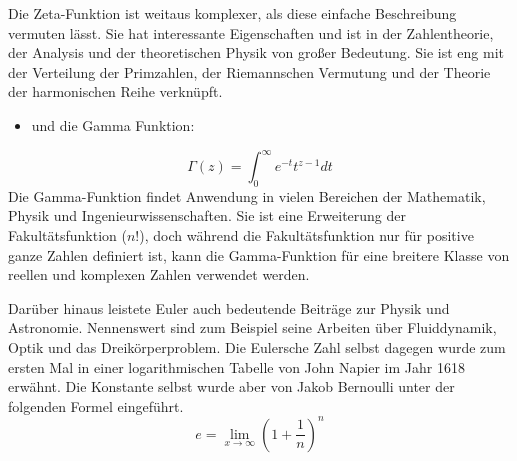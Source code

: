 Die Zeta-Funktion ist weitaus komplexer, als diese einfache Beschreibung vermuten lässt. Sie hat interessante Eigenschaften und ist in der Zahlentheorie, der Analysis und der theoretischen Physik von großer Bedeutung. Sie ist eng mit der Verteilung der Primzahlen, der Riemannschen Vermutung und der Theorie der harmonischen Reihe verknüpft.
\begin{itemize}
  \item und die Gamma Funktion:
\end{itemize} \[
\Gamma(z) = \int_0^\infty e^{-t} t^{z-1} dt \] 
Die Gamma-Funktion findet Anwendung in vielen Bereichen der Mathematik, Physik und Ingenieurwissenschaften. Sie ist eine Erweiterung der Fakultätsfunktion ($n!$), doch während die Fakultätsfunktion nur für positive ganze Zahlen definiert ist, kann die Gamma-Funktion für eine breitere Klasse von reellen und komplexen Zahlen verwendet werden.
\par Darüber hinaus leistete Euler auch bedeutende Beiträge zur Physik und Astronomie. Nennenswert sind zum Beispiel seine Arbeiten über Fluiddynamik, Optik und das Dreikörperproblem. Die Eulersche Zahl selbst dagegen wurde zum ersten Mal in einer logarithmischen Tabelle von John Napier im Jahr 1618 erwähnt. Die Konstante selbst wurde aber von Jakob Bernoulli unter der folgenden Formel eingeführt. \[
e = \lim_{x\to\infty}(1+\frac{1}{n})^n \]
